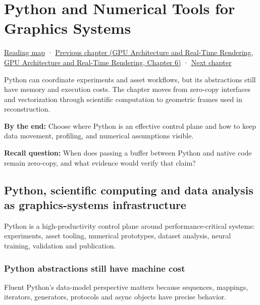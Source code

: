 \hypertarget{01-foundations-i-ch017}{}
\chapter{Python and Numerical Tools for Graphics Systems}\label{stagechapter:01-foundations-i-ch017}\label{01-foundations-i-ch017-python-and-numerical-tools-for-graphics-systems}

\hyperref[volume-reading-map]{Reading map} · \href{../06-GPU-Architecture-and-Real-Time-Rendering/main.pdf\#nameddest=01-foundations-i-ch016-profile-gpus-and-respect-apple-ownership-boundaries}{Previous chapter (GPU Architecture and Real-Time Rendering, GPU Architecture and Real-Time Rendering, Chapter 6)} · \hyperref[01-foundations-i-ch018-vectors-for-light-and-frames]{Next chapter}

Python can coordinate experiments and asset workflows, but its abstractions still have memory and execution costs. The chapter moves from zero-copy interfaces and vectorization through scientific computation to geometric frames used in reconstruction.

\textbf{By the end:} Choose where Python is an effective control plane and how to keep data movement, profiling, and numerical assumptions visible.

\textbf{Recall question:} When does passing a buffer between Python and native code remain zero-copy, and what evidence would verify that claim?

\section{Python, scientific computing and data analysis as graphics-systems infrastructure}\label{01-foundations-i-ch017-python-scientific-computing-and-data-analysis-as-graphics-systems-infrastructure}

Python is a high-productivity control plane around performance-critical systems: experiments, asset tooling, numerical prototypes, dataset analysis, neural training, validation and publication.

\subsection{Python abstractions still have machine cost}\label{01-foundations-i-ch017-python-abstractions-still-have-machine-cost}

Fluent Python's data-model perspective matters because sequences, mappings, iterators, generators, protocols and async objects have precise behavior.

